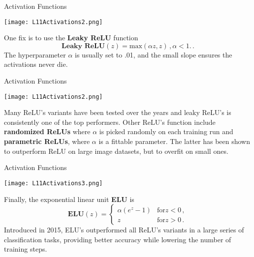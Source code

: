 \documentclass[10pt, table, dvipsnames,xcdraw,handout]{beamer}
\begin{document}
\begin{frame}[fragile]{Activation Functions}
  \begin{minipage}[t][0.5\textheight][t]{\textwidth}
	\centering \texttt{[image: L11Activations2.png]} 
  \end{minipage}
  \vfill
\begin{minipage}[t][0.5\textheight][t]{\textwidth}
One fix is to use the \textbf{Leaky ReLU} function
$$
\textbf{Leaky ReLU}(z) = \text{max}(\alpha z,z)\,, \alpha<1.\,.
$$
The hyperparameter $\alpha$ is usually set to .01, and the small slope ensures the activations never die.
\end{minipage}
\end{frame}



\begin{frame}[fragile]{Activation Functions}
  \begin{minipage}[t][0.5\textheight][t]{\textwidth}
	\centering \texttt{[image: L11Activations2.png]} 
  \end{minipage}
  \vfill
\begin{minipage}[t][0.5\textheight][t]{\textwidth}
Many ReLU's variants have been tested over the years and leaky ReLU's is consistently one of the top performers. Other ReLU's function include \textbf{randomized ReLUs} where $\alpha$ is picked randomly on each training run and \textbf{parametric ReLUs}, where $\alpha$ is a fittable parameter.  The latter has been shown to outperform ReLU on large image datasets, but to overfit on small ones. 
\end{minipage}
\end{frame}



\begin{frame}[fragile]{Activation Functions}
  \begin{minipage}[t][0.5\textheight][t]{\textwidth}
	\centering \texttt{[image: L11Activations3.png]} 
  \end{minipage}
  \vfill
\begin{minipage}[t][0.5\textheight][t]{\textwidth}
Finally, the exponential linear unit \textbf{ELU} is
$$
\textbf{ELU}(z) = \begin{cases}
\alpha (e^z - 1)&\text{for} z<0\,,
\\
z&\text{for} z>0\,.
\end{cases}
$$
Introduced in 2015, ELU's outperformed all ReLU's variants in a large series of classification tasks, providing better accuracy while lowering the number of training steps. 
\end{minipage}
\end{frame}
\end{document}
